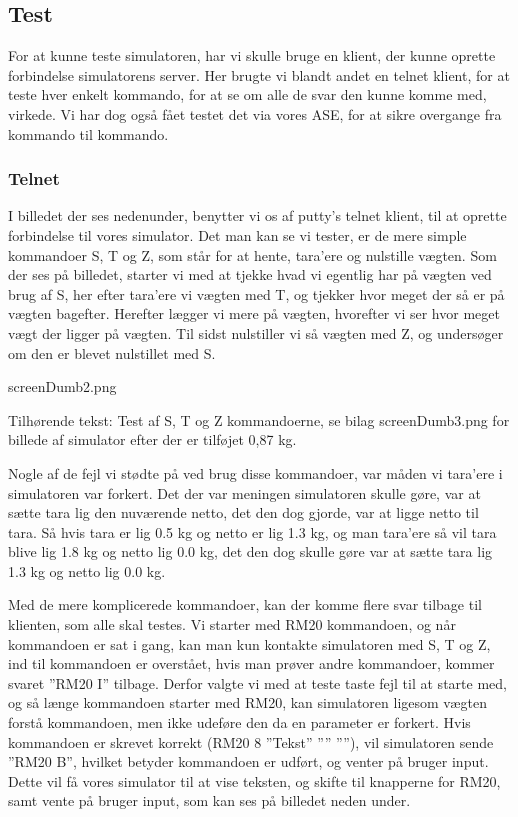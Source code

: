 \documentclass[a4paper]{article}
\begin{document}
\subsection{Test} %

For at kunne teste simulatoren, har vi skulle bruge en klient, der kunne oprette forbindelse simulatorens server. Her brugte vi blandt andet en telnet klient, for at teste hver enkelt kommando, for at se om alle de svar den kunne komme med, virkede. Vi har dog også fået testet det via vores ASE, for at sikre overgange fra kommando til kommando.

\subsubsection{Telnet} %

I billedet der ses nedenunder, benytter vi os af putty’s telnet klient, til at oprette forbindelse til vores simulator. Det man kan se vi tester, er de mere simple kommandoer S, T og Z, som står for at hente, tara’ere og nulstille vægten. Som der ses på billedet, starter vi med at tjekke hvad vi egentlig har på vægten ved brug af S, her efter tara’ere vi vægten med T, og tjekker hvor meget der så er på vægten bagefter. Herefter lægger vi mere på vægten, hvorefter vi ser hvor meget vægt der ligger på vægten. Til sidst nulstiller vi så vægten med Z, og undersøger om den er blevet nulstillet med S.

\begin{center}
screenDumb2.png

Tilhørende tekst: Test af S, T og Z kommandoerne, se bilag screenDumb3.png for billede af simulator efter der er tilføjet 0,87 kg.
\end{center}

Nogle af de fejl vi stødte på ved brug disse kommandoer, var måden vi tara’ere i simulatoren var forkert. Det der var meningen simulatoren skulle gøre, var at sætte tara lig den nuværende netto, det den dog gjorde, var at ligge netto til tara. Så hvis tara er lig 0.5 kg og netto er lig 1.3 kg, og man tara’ere så vil tara blive lig 1.8 kg og netto lig 0.0 kg, det den dog skulle gøre var at sætte tara lig 1.3 kg og netto lig 0.0 kg.

Med de mere komplicerede kommandoer, kan der komme flere svar tilbage til klienten, som alle skal testes. Vi starter med RM20 kommandoen, og når kommandoen er sat i gang, kan man kun kontakte simulatoren med S, T og Z, ind til kommandoen er overstået, hvis man prøver andre kommandoer, kommer svaret ”RM20 I” tilbage. Derfor valgte vi med at teste taste fejl til at starte med, og så længe kommandoen starter med RM20, kan simulatoren ligesom vægten forstå kommandoen, men ikke udeføre den da en parameter er forkert. Hvis kommandoen er skrevet korrekt (RM20 8 ”Tekst” ”” ””), vil simulatoren sende ”RM20 B”, hvilket betyder kommandoen er udført, og venter på bruger input. Dette vil få vores simulator til at vise teksten, og skifte til knapperne for RM20, samt vente på bruger input, som kan ses på billedet neden under.
\end{document}
